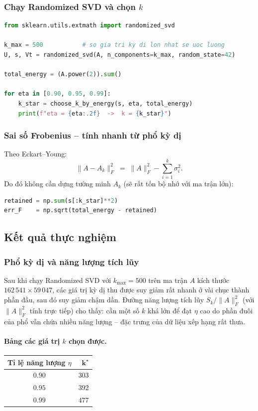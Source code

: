 \subsubsection{Chạy Randomized SVD và chọn $k$}

\begin{lstlisting}[language=Python]
from sklearn.utils.extmath import randomized_svd

k_max = 500           # so gia tri ky di lon nhat se uoc luong
U, s, Vt = randomized_svd(A, n_components=k_max, random_state=42)

total_energy = (A.power(2)).sum()

for eta in [0.90, 0.95, 0.99]:
    k_star = choose_k_by_energy(s, eta, total_energy)
    print(f"eta = {eta:.2f}  ->  k = {k_star}")
\end{lstlisting}

\subsubsection{Sai số Frobenius -- tính nhanh từ phổ kỳ dị}

Theo Eckart--Young:
\[
\|A - A_k\|_F^2 \;=\; \|A\|_F^2 - \sum_{i=1}^{k}\sigma_i^2.
\]
Do đó không cần dựng tường minh $A_k$ (sẽ rất tốn bộ nhớ với ma trận lớn):
\begin{lstlisting}[language=Python]
retained = np.sum(s[:k_star]**2)
err_F    = np.sqrt(total_energy - retained)
\end{lstlisting}

\subsection{Kết quả thực nghiệm}

\subsubsection{Phổ kỳ dị và năng lượng tích lũy}

Sau khi chạy Randomized SVD với $k_{\max}=500$ trên ma trận $A$ kích thước
$162\,541 \times 59\,047$, các giá trị kỳ dị thu được suy giảm rất nhanh ở vài
chục thành phần đầu, sau đó suy giảm chậm dần. Đường năng lượng tích lũy
$S_k/\|A\|_F^2$ (với $\|A\|_F^2$ tính trực tiếp) cho thấy: cần một số $k$ khá
lớn để đạt $\eta$ cao do phần đuôi của phổ vẫn chứa nhiều năng lượng -- đặc
trưng của dữ liệu xếp hạng rất thưa.

\paragraph{Bảng các giá trị $k$ chọn được.}
\begin{center}
\begin{tabular}{|c|r|}
\hline
\textbf{Tỉ lệ năng lượng} $\eta$ & $\boldsymbol{k^\star}$ \\
\hline
$0.90$ & $303$ \\
$0.95$ & $392$ \\
$0.99$ & $477$ \\
\hline
\end{tabular}
\end{center}

